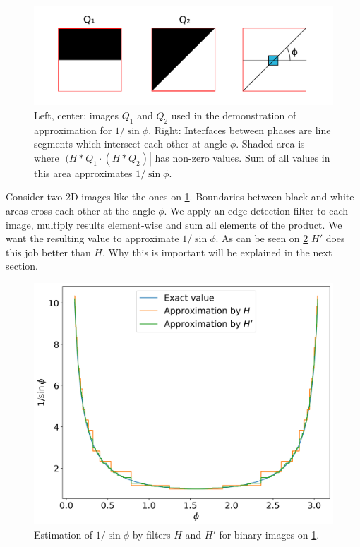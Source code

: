 \documentclass[preprint]{elsarticle}
\begin{document}
\begin{figure}
  \centering
  \includegraphics[width=0.8\linewidth]{images/experiment-setup.png}
  \caption[]{Left, center: images $Q_1$ and $Q_2$ used in the demonstration of
    approximation for $1 / \sin \phi$. Right: Interfaces between phases are
    line segments which intersect each other at angle $\phi$. Shaded area is
    where $|(H*Q_1\cdot(H*Q_2)|$ has non-zero values. Sum of all values in this
    area approximates $1 / \sin \phi$.}
  \label{fig:experiment-setup}
\end{figure}
Consider two 2D images like the ones on \cref{fig:experiment-setup}. Boundaries
between black and white areas cross each other at the angle $\phi$. We apply an
edge detection filter to each image, multiply results element-wise and sum all
elements of the product. We want the resulting value to approximate
$1/\sin \phi$. As can be seen on \cref{fig:filter-comparison} $H'$ does this job
better than $H$. Why this is important will be explained in the next section.
\begin{figure}
  \centering
  \includegraphics[width=0.8\linewidth]{images/filter-comparison.png}
  \caption[]{Estimation of $1/\sin\phi$ by filters $H$ and $H'$ for binary
    images on \cref{fig:experiment-setup}.}
  \label{fig:filter-comparison}
\end{figure}
\end{document}
